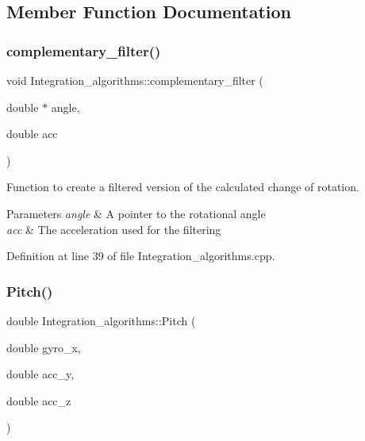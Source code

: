 \subsection{Member Function Documentation}
\mbox{\label{class_integration__algorithms_a0966fe666b2c99a384c7a138a6817ece}} 
\subsubsection{\texorpdfstring{complementary\_filter()}{complementary\_filter()}}
{\footnotesize\ttfamily void Integration\+\_\+algorithms\+::complementary\+\_\+filter (\begin{DoxyParamCaption}\item[{double $\ast$}]{angle,  }\item[{double}]{acc }\end{DoxyParamCaption})}



Function to create a filtered version of the calculated change of rotation. 


\begin{DoxyParams}{Parameters}
{\em angle} & A pointer to the rotational angle \\
\hline
{\em acc} & The acceleration used for the filtering \\
\hline
\end{DoxyParams}


Definition at line 39 of file Integration\+\_\+algorithms.\+cpp.


\begin{DoxyCode}{0}

\end{DoxyCode}
\mbox{\label{class_integration__algorithms_aa501e38449c081dd1ece866f5e9a4150}} 
\subsubsection{\texorpdfstring{Pitch()}{Pitch()}}
{\footnotesize\ttfamily double Integration\+\_\+algorithms\+::\+Pitch (\begin{DoxyParamCaption}\item[{double}]{gyro\+\_\+x,  }\item[{double}]{acc\+\_\+y,  }\item[{double}]{acc\+\_\+z }\end{DoxyParamCaption})}



